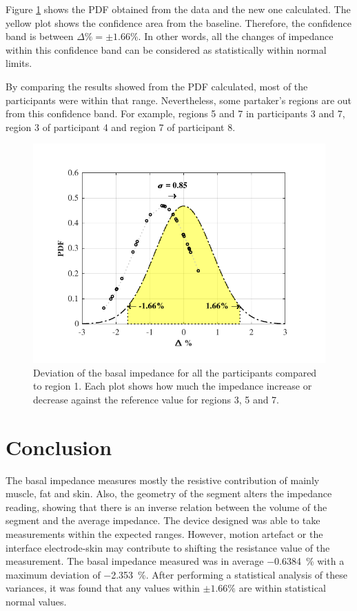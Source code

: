 Figure \ref{fig:basal pdf} shows the PDF obtained from the data and the new one calculated. The yellow plot shows the confidence area from the baseline. Therefore, the confidence band is between $\Delta \% = \pm 1.66 \%$. In other words, all the changes of impedance within this confidence band can be considered as statistically within normal limits. 

By comparing the results showed from the PDF calculated, most of the participants were within that range. Nevertheless, some partaker's regions are out from this confidence band. For example, regions 5 and 7 in participants 3 and 7, region 3 of participant 4 and region 7 of participant 8.

\begin{figure}[!b]  %
	\centering
	\includegraphics[width=12cm,keepaspectratio, trim={0cm 0cm 0cm 0cm},clip]{figure_b_5}    
	\caption[Percentil change of baseline imepdance]{Deviation of the basal impedance for all the participants compared to region 1. Each plot shows how much the impedance increase or decrease against the reference value for regions 3, 5 and 7. }
	\label{fig:basal pdf} 
\end{figure}

\section{Conclusion}
\label{senction basal 5} 
The basal impedance measures mostly the resistive contribution of mainly muscle, fat and skin. Also, the geometry of the segment alters the impedance reading, showing that there is an inverse relation between the volume of the segment and the average impedance. The device designed was able to take measurements within the expected ranges. However, motion artefact or the interface electrode-skin may contribute to shifting the resistance value of the measurement. The basal impedance measured was in average \SI{-0.6384}{\percent} with a maximum deviation of \SI{-2.353}{\percent}. After performing a statistical analysis of these variances, it was found that any values within $\pm 1.66 \%$ are within statistical normal values. 

